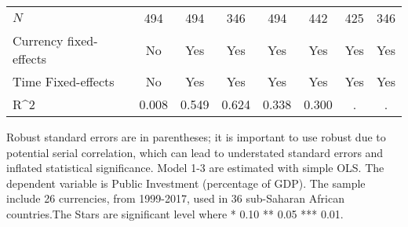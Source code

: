\begin{table}[H]
\begin{adjustbox}{max width=\textwidth}
\begin{tabular}{l*{7}{c}}
\midrule
\(N\)       &         494         &         494         &         346         &         494         &         442         &         425         &         346         \\
Currency fixed-effects&          No         &         Yes         &         Yes         &         Yes         &         Yes         &         Yes         &         Yes         \\
Time Fixed-effects&          No         &         Yes         &         Yes         &         Yes         &         Yes         &         Yes         &         Yes         \\
R^{2}       &       0.008         &       0.549         &       0.624         &       0.338         &       0.300         &           .         &           .         \\
\bottomrule \end{tabular} \end{adjustbox} \footnotesize \item Robust standard errors are in parentheses; it is important to use robust due to potential serial correlation, which can lead to understated standard errors and inflated statistical significance. Model 1-3 are estimated with simple OLS. The dependent variable is Public Investment (percentage of GDP). The sample include 26 currencies, from 1999-2017, used in 36 sub-Saharan African countries.The Stars are significant level where * 0.10 ** 0.05 *** 0.01. \end{table}
